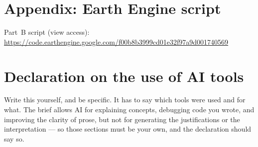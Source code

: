 \documentclass[11pt,a4paper]{article}
\newcommand\TODO{}
\begin{document}
\section*{Appendix: Earth Engine script}

Part~B script (view access):\\
\url{https://code.earthengine.google.com/f00b8b3999cd01e32f97a9d001740569}

\section*{Declaration on the use of AI tools}

\TODO{Write this yourself, and be specific. It has to say which tools
were used and for what. The brief allows AI for explaining concepts,
debugging code you wrote, and improving the clarity of prose, but not
for generating the justifications or the interpretation --- so those
sections must be your own, and the declaration should say so.}
\end{document}
